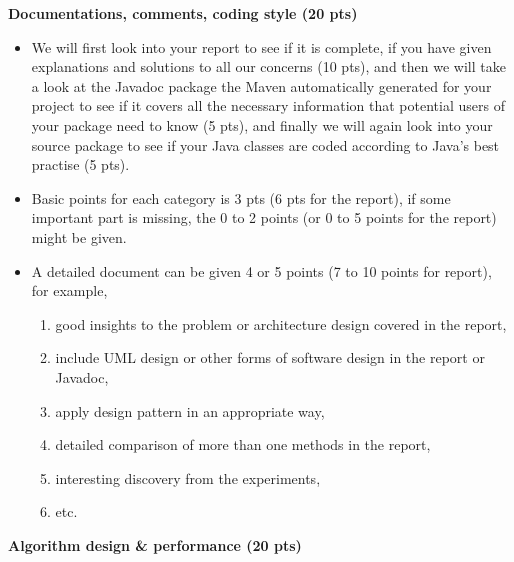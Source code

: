 \textbf{Documentations, comments, coding style (20 pts)}

\begin{itemize}

\item We will first look into your report to see if it is complete, if you have
given explanations and solutions to all our concerns (10 pts), and then we will
take a look at the Javadoc package the Maven automatically generated for your
project to see if it covers all the necessary information that potential users
of your package need to know (5 pts), and finally we will again look into your
source package to see if your Java classes are coded according to Java's best
practise (5 pts).

\item Basic points for each category is 3 pts (6 pts for the report), if some
important part is missing, the 0 to 2 points (or 0 to 5 points for the report)
might be given.

\item A detailed document can be given 4 or 5 points (7 to 10 points for report), for example,

\begin{enumerate}
\item good insights to the problem or architecture design covered in the report,
\item include UML design or other forms of software design in the report or Javadoc,
\item apply design pattern in an appropriate way,
\item detailed comparison of more than one methods in the report,
\item interesting discovery from the experiments,
\item etc.
\end{enumerate}

\end{itemize}

\textbf{Algorithm design \& performance (20 pts)}

